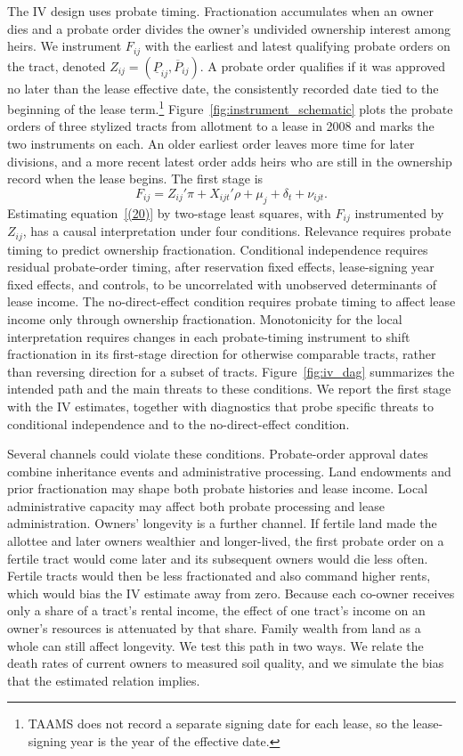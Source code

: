 \documentclass[12pt]{article}
\begin{document}
The IV design uses probate timing. Fractionation accumulates when an owner dies and a probate order divides the owner's undivided ownership interest among heirs. We instrument $F_{ij}$ with the earliest and latest qualifying probate orders on the tract, denoted $Z_{ij}=(\underline{P}_{ij},\overline{P}_{ij})$. A probate order qualifies if it was approved no later than the lease effective date, the consistently recorded date tied to the beginning of the lease term.\footnote{TAAMS does not record a separate signing date for each lease, so the lease-signing year is the year of the effective date.} Figure~\ref{fig:instrument_schematic} plots the probate orders of three stylized tracts from allotment to a lease in 2008 and marks the two instruments on each. An older earliest order leaves more time for later divisions, and a more recent latest order adds heirs who are still in the ownership record when the lease begins. The first stage is
\begin{equation} \label{(21)}
   F_{ij} = Z_{ij}'\pi + X_{ijt}'\rho + \mu_j + \delta_t + \nu_{ijt}.
\end{equation}
\noindent Estimating equation~\eqref{(20)} by two-stage least squares, with $F_{ij}$ instrumented by $Z_{ij}$, has a causal interpretation under four conditions. Relevance requires probate timing to predict ownership fractionation. Conditional independence requires residual probate-order timing, after reservation fixed effects, lease-signing year fixed effects, and controls, to be uncorrelated with unobserved determinants of lease income. The no-direct-effect condition requires probate timing to affect lease income only through ownership fractionation. Monotonicity for the local interpretation requires changes in each probate-timing instrument to shift fractionation in its first-stage direction for otherwise comparable tracts, rather than reversing direction for a subset of tracts. Figure~\ref{fig:iv_dag} summarizes the intended path and the main threats to these conditions. We report the first stage with the IV estimates, together with diagnostics that probe specific threats to conditional independence and to the no-direct-effect condition.

Several channels could violate these conditions. Probate-order approval dates combine inheritance events and administrative processing. Land endowments and prior fractionation may shape both probate histories and lease income. Local administrative capacity may affect both probate processing and lease administration. Owners' longevity is a further channel. If fertile land made the allottee and later owners wealthier and longer-lived, the first probate order on a fertile tract would come later and its subsequent owners would die less often. Fertile tracts would then be less fractionated and also command higher rents, which would bias the IV estimate away from zero. Because each co-owner receives only a share of a tract's rental income, the effect of one tract's income on an owner's resources is attenuated by that share. Family wealth from land as a whole can still affect longevity. We test this path in two ways. We relate the death rates of current owners to measured soil quality, and we simulate the bias that the estimated relation implies.
\end{document}
